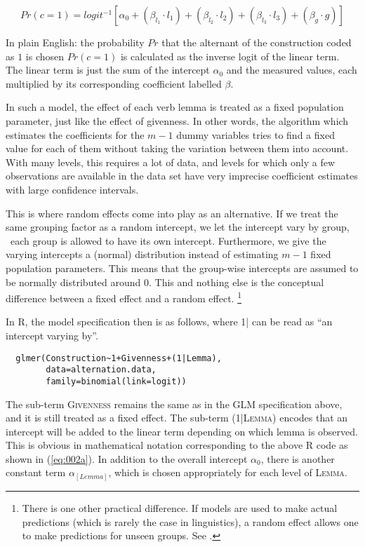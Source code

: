 \begin{equation}
  Pr(c=1)=logit^{-1}\left[\alpha_0+(\beta_{l_1}\cdot l_1)+(\beta_{l_2}\cdot l_2)+(\beta_{l_3}\cdot l_3)+(\beta_{g}\cdot g)\right]
  \label{eq:001a}
\end{equation}

In plain English: the probability $Pr$ that the alternant of the construction coded as $1$ is chosen $Pr(c=1)$ is calculated as the inverse logit of the linear term.
The linear term is just the sum of the intercept $\alpha_0$ and the measured values, each multiplied by its corresponding coefficient labelled $\beta$.

In such a model, the effect of each verb lemma is treated as a fixed population parameter, just like the effect of givenness.
In other words, the algorithm which estimates the coefficients for the $m-1$ dummy variables tries to find a fixed value for each of them without taking the variation between them into account.
With many levels, this requires a lot of data, and levels for which only a few observations are available in the data set have very imprecise coefficient estimates with large confidence intervals.

This is where random effects come into play as an alternative.
If we treat the same grouping factor as a random intercept, we let the intercept vary by group, \ie\ each group is allowed to have its own intercept.
Furthermore, we give the varying intercepts a (normal) distribution instead of estimating $m-1$ fixed population parameters.
This means that the group-wise intercepts are assumed to be normally distributed around $0$.
This and nothing else is the conceptual difference between a fixed effect and a random effect.%
\footnote{There is one other practical difference.
If models are used to make actual predictions (which is rarely the case in linguistics), a random effect allows one to make predictions for unseen groups.
See \citet[272--275]{GelmanHill2007}.}

In R, the model specification then is as follows, where \textsc{1|} can be read as ``an intercept varying by''.

\begin{lstlisting}
  glmer(Construction~1+Givenness+(1|Lemma),
        data=alternation.data,
        family=binomial(link=logit))
\end{lstlisting}

The sub-term \textsc{Givenness} remains the same as in the GLM specification above, and it is still treated as a fixed effect.
The sub-term \textsc{(1|Lemma)} encodes that an intercept will be added to the linear term depending on which lemma is observed.
This is obvious in mathematical notation corresponding to the above R code as shown in (\ref{eq:002a}).
In addition to the overall intercept $\alpha_0$, there is another constant term $\alpha_{[Lemma]}$, which is chosen appropriately for each level of \textsc{Lemma}.

